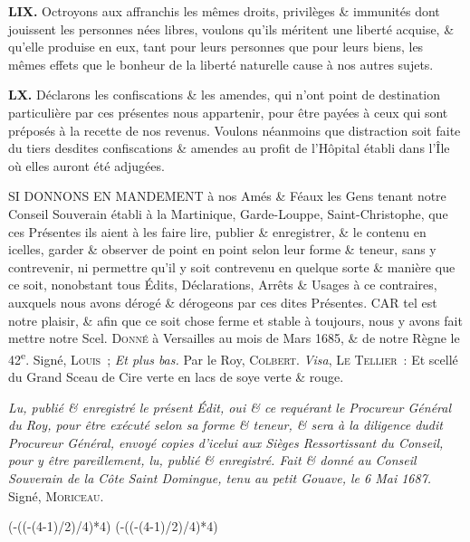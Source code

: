 \documentclass[twoside]{book} %
\newcommand{\labelchar}[1]{\textbf{\color{rubric} #1}}
\def\truncdiv#1#2{((#1-(#2-1)/2)/#2)}
\def\moduloop#1#2{(#1-\truncdiv{#1}{#2}*#2)}
\def\modulo#1#2{\number\numexpr\moduloop{#1}{#2}\relax}
\begin{document}
\labelchar{LIX.} Octroyons aux affranchis les mêmes droits, privilèges \& immunités dont jouissent les personnes nées libres, voulons qu’ils méritent une liberté acquise, \& qu’elle produise en eux, tant pour leurs personnes que pour leurs biens, les mêmes effets que le bonheur de la liberté naturelle cause à nos autres sujets.\par
\labelchar{LX.} Déclarons les confiscations \& les amendes, qui n’ont point de destination particulière par ces présentes nous appartenir, pour être payées à ceux qui sont préposés à la recette de nos revenus. Voulons néanmoins que distraction soit faite du tiers desdites confiscations \& amendes au profit de l’Hôpital établi dans l’Île où elles auront été adjugées.\par
SI DONNONS EN MANDEMENT à nos Amés \& Féaux les Gens tenant notre Conseil Souverain établi à la Martinique, Garde-Louppe, Saint-Christophe, que ces Présentes ils aient à les faire lire, publier \& enregistrer, \& le contenu en icelles, garder \& observer de point en point selon leur forme \& teneur, sans y contrevenir, ni permettre qu’il y soit contrevenu en quelque sorte \& manière que ce soit, nonobstant tous Édits, Déclarations, Arrêts \& Usages à ce contraires, auxquels nous avons dérogé \& dérogeons par ces dites Présentes. CAR tel est notre plaisir, \& afin que ce soit chose ferme et stable à toujours, nous y avons fait mettre notre Scel. {\scshape Donné} à Versailles au mois de Mars 1685, \& de notre Règne le 42\textsuperscript{e}. Signé, {\scshape Louis} ; \emph{Et plus bas.} Par le Roy, {\scshape Colbert}. \emph{Visa}, {\scshape Le Tellier} : Et scellé du Grand Sceau de Cire verte en lacs de soye verte \& rouge.\par
\emph{Lu, publié \& enregistré le présent Édit, oui \& ce requérant le Procureur Général du Roy, pour être exécuté selon sa forme \& teneur, \& sera à la diligence dudit Procureur Général, envoyé copies d’icelui aux Sièges Ressortissant du Conseil, pour y être pareillement, lu, publié \& enregistré. Fait \& donné au Conseil Souverain de la Côte Saint Domingue, tenu au petit Gouave, le 6 Mai 1687.} Signé, {\scshape Moriceau}.
 


\ifbooklet
  \pagestyle{empty}
  \clearpage
  \ifnum\modulo{\value{page}}{4}=0 \hbox{}\newpage\hbox{}\newpage\fi
  \ifnum\modulo{\value{page}}{4}=1 \hbox{}\newpage\hbox{}\newpage\fi
\end{document}
